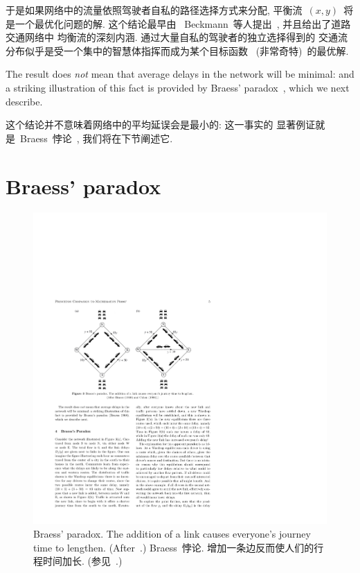 \documentclass[a4paper,12pt, twocolumn]{article}
\begin{document}
于是如果网络中的流量依照驾驶者自私的路径选择方式来分配, 
平衡流~$(x, y)$~将是一个最优化问题的解. 这个结论最早由
~Beckmann~等人提出~\cite{BMW},  并且给出了道路交通网络中
均衡流的深刻内涵. 通过大量自私的驾驶者的独立选择得到的
交通流分布似乎是受一个集中的智慧体指挥而成为某个目标函数
~(非常奇特)~的最优解. 

The result does {\it not} mean that
average delays in the network will be minimal: and a striking
illustration of this fact is provided by Braess' paradox~\cite{BRA},
which we next describe. 

这个结论并不意味着网络中的平均延误会是最小的: 这一事实的
显著例证就是~Braess~悖论~\cite{BRA}, 我们将在下节阐述它. 

\section{Braess' paradox}

\begin{figure}[ht]
\centering
\includegraphics{p3}
\caption{Braess' paradox. The addition of a link causes everyone's
journey time to lengthen. (After~\cite{BRA, COH}.)
Braess~悖论. 增加一条边反而使人们的行程时间加长. 
(参见~\cite{BRA, COH}.)
\label{Fig-pcm0052.3}}
\end{figure}
 
\end{document}
